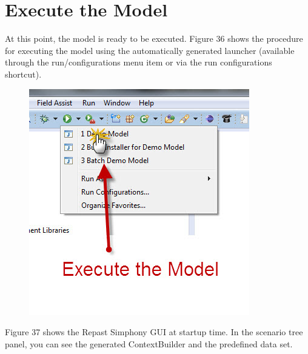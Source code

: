 \documentclass[11pt]{amsart}
\begin{document}
\newpage

\section{Execute the Model}
At this point, the model is ready to be executed. Figure 36 shows the procedure for executing the model using the automatically generated launcher (available through the run/configurations menu item or via the run configurations shortcut).


\begin{figure}[ht]
\begin{center}
\vspace{.2in}
\centerline {
\includegraphics[totalheight=0.3\textheight]{images/034.jpg}
}
\caption{}
\label{fig:034}
\end{center}
\end{figure}


Figure 37 shows the Repast Simphony GUI at startup time. In the scenario tree panel, you can see the generated ContextBuilder and the predefined data set. 
\end{document}
